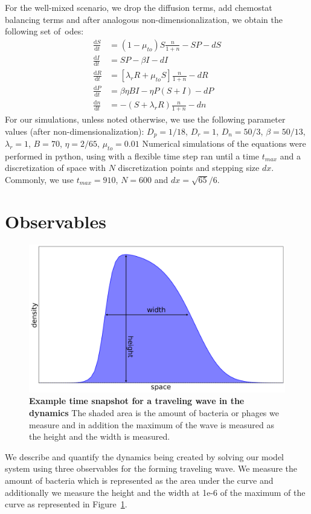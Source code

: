 For the well-mixed scenario, we drop the diffusion terms, add chemostat balancing terms and after analogous non-dimensionalization, we obtain the following set of~\gls{ode}s:
\begin{align}
    \frac{\text{d}S}{\text{d}t} &= \left( 1 - \mu_{to} \right) S \frac{n}{1+n}  - SP - d S\\
    \frac{\text{d}I}{\text{d}t} &= SP - \beta I - d I\\
    \frac{\text{d}R}{\text{d}t} &= \left[\lambda_r R + \mu_{to} S \right] \frac{n}{1+n} - d R\\
    \frac{\text{d}P}{\text{d}t} &= \beta \eta BI - \eta P(S+I) -d P\\
    \frac{\text{d}n}{\text{d}t} &= - \left( S + \lambda_r R \right) \frac{n}{1+n} - d n
\end{align}
For our simulations, unless noted otherwise, we use the following parameter values (after non-dimensionalization):
$D_p = 1/18$, $D_r = 1$, $D_n = 50/3$, $\beta = 50/13$, $\lambda_r = 1$, $B = 70$, $\eta = 2/65$, $\mu_{to} = 0.01$
Numerical simulations of the equations were performed in python, using  with a flexible time step ran until a time $t_{max}$ and a discretization of space with $N$ discretization points and stepping size $dx$.
Commonly, we use $t_{max} = 910$, $N = 600$ and $dx = \sqrt{65}/6$.

\section{Observables}
\begin{figure}
\centering
\includegraphics[width=\linewidth]{graphics/2025_09_30_phages_fig2.png}
\caption{\textbf{Example time snapshot for a traveling wave in the dynamics} The shaded area is the amount of bacteria or phages we measure and in addition the maximum of the wave is measured as the height and the width is measured.}
\label{fig:observable_sketch}
\end{figure}
We describe and quantify the dynamics being created by solving our model system using three observables for the forming traveling wave. We measure the amount of bacteria which is represented as the area under the curve and additionally we measure the height and the width at 1e-6 of the maximum of the curve as represented in Figure~\ref{fig:observable_sketch}.
